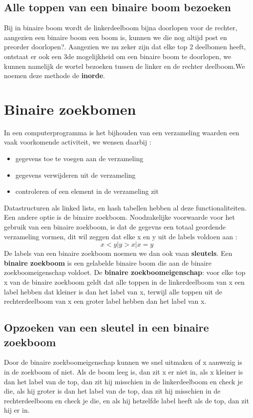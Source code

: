 \documentclass{report}
\begin{document}
  			\subsection{Alle toppen van een binaire boom bezoeken}
  				Bij in binaire boom wordt de linkerdeelboom bijna doorlopen voor de rechter, aangezien een binaire boom een boom is, kunnen we die nog altijd post en preorder doorlopen?. Aangezien we nu zeker zijn dat elke top 2 deelbomen heeft, ontstaat er ook een 3de mogelijkheid om een binaire boom te doorlopen, we kunnen namelijk de wortel bezoeken tussen de linker en de rechter deelboom.We noemen deze methode de \textbf{inorde}.
  		\section{Binaire zoekbomen}
  			In een computerprogramma is het bijhouden van een verzameling waarden een vaak voorkomende activiteit, we wensen daarbij : 
  			\begin{itemize}
  				\item gegevens toe te voegen aan de verzameling
  				\item gegevens verwijderen uit de verzameling
  				\item controleren of een element in de verzameling zit
  			\end{itemize}
  			Datastructuren als linked lists, en hash tabellen hebben al deze functionaliteiten. Een andere optie is de binaire zoekboom. Noodzakelijke voorwaarde voor het gebruik van een binaire zoekboom, is dat de gegevns een totaal geordende verzameling vormen, dit wil zeggen dat elke x en y uit de labels voldoen aan : 
  			\[x < y | y > x | x = y\]
  			De labels van een binaire zoekboom noemen we dan ook vaan \textbf{sleutels}.
  			Een \textbf{binaire zoekboom} is een gelabelde binaire boom die aan de binaire zoekboomeigenschap voldoet. 
  			De \textbf{binaire zoekboomeigenschap}: voor elke top x van de binaire zoekboom geldt dat alle toppen in de linkerdeelboom van x een label hebben dat kleiner is dan het label van x, terwijl alle toppen uit de rechterdeelboom van x een groter label hebben dan het label van x.
  			\subsection{Opzoeken van een sleutel in een binaire zoekboom}
  				Door de binaire zoekboomeigenschap kunnen we snel uitmaken of x aanwezig is in de zoekboom of niet. Als de boom leeg is, dan zit x er niet in, als x kleiner is dan het label van de top, dan zit hij misschien in de linkerdeelboom en check je die, als hij groter is dan het label van de top, dan zit hij misschien in de rechterdeelboom en check je die, en als hij hetzelfde label heeft als de top, dan zit hij er in. 
\end{document}
